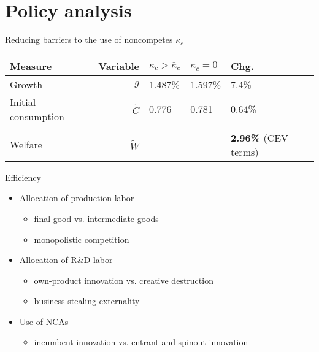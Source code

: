 \documentclass[english,usenames,dvipsnames]{beamer}
\begin{document}
\section{Policy analysis}

\begin{frame}
\tableofcontents[currentsection]
\end{frame}

\begin{frame}{Reducing barriers to the use of noncompetes $\kappa_c$}\label{reducing_kappa_c_table}
	\begin{table}
		\centering
		\small
		\begin{tabular}{lrlll}
			\toprule \toprule
			Measure & Variable & $\kappa_c > \bar{\kappa}_c$ & $\kappa_c = 0$ & Chg. \tabularnewline
			\midrule
			Growth & $g$ & 1.487\% & 1.597\% & 7.4\% \tabularnewline
			Initial consumption & $\tilde{C}$  & 0.776 &  0.781 & 0.64\% \tabularnewline 
			\tabularnewline
			Welfare & $\tilde{W}$  &  & & \alert{\textbf{2.96\%}} (CEV terms)  \tabularnewline
			\bottomrule
		\end{tabular}
	\end{table}
	\hyperlink{decomposition_growth_increase}{}
	\hyperlink{reducing_kappa_c}{}
	\hyperlink{robustness_to_moments}{} \hyperlink{robustness_to_parameters}{}
\end{frame}


\begin{frame}{Efficiency}\label{efficiency}
	\hyperlink{welfare}{} 
	\medskip
	\begin{itemize}
		\item Allocation of production labor
		\begin{itemize}
			\item final good vs. intermediate goods
			\item monopolistic competition
		\end{itemize}
		\medskip
		\item Allocation of R\&D labor  
		\begin{itemize}
			\item own-product innovation vs. creative destruction 
			\item business stealing externality \hyperlink{misallocation_of_rd}{} 
		\end{itemize}
		\medskip
		\item Use of NCAs 
		\begin{itemize}
			\item incumbent innovation vs. entrant and spinout innovation  \hyperlink{misallocation_of_nca}{} 
		\end{itemize}
	\end{itemize}
\end{frame}
\end{document}

